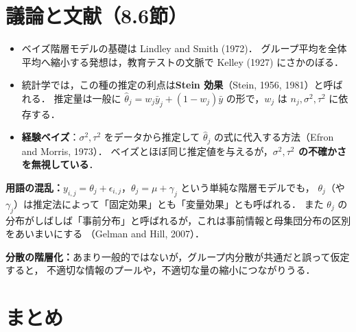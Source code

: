 \documentclass[lualatex,ja=standard,a4paper,12pt]{bxjsarticle}
\begin{document}
\section{議論と文献（8.6節）}

\begin{itemize}
  \item ベイズ階層モデルの基礎は Lindley and Smith (1972)．
        グループ平均を全体平均へ縮小する発想は，教育テストの文脈で Kelley (1927) にさかのぼる．
  \item 統計学では，この種の推定の利点は\textbf{Stein 効果}（Stein, 1956, 1981）と呼ばれる．
        推定量は一般に $\hat{\theta}_j = w_j\bar{y}_j + (1 - w_j)\bar{y}$ の形で，$w_j$ は $n_j, \sigma^2, \tau^2$ に依存する．
  \item \textbf{経験ベイズ}：$\sigma^2, \tau^2$ をデータから推定して $\hat{\theta}_j$ の式に代入する方法（Efron and Morris, 1973）．
        ベイズとほぼ同じ推定値を与えるが，\textbf{$\sigma^2, \tau^2$ の不確かさを無視している}．
\end{itemize}

\begin{warningbox}
\textbf{用語の混乱：}$y_{i,j} = \theta_j + \epsilon_{i,j}$，$\theta_j = \mu + \gamma_j$ という単純な階層モデルでも，
$\theta_j$（や $\gamma_j$）は推定法によって「固定効果」とも「変量効果」とも呼ばれる．
また $\theta_j$ の分布がしばしば「事前分布」と呼ばれるが，これは事前情報と母集団分布の区別をあいまいにする
（Gelman and Hill, 2007）．

\medskip
\textbf{分散の階層化：}あまり一般的ではないが，グループ内分散が共通だと誤って仮定すると，
不適切な情報のプールや，不適切な量の縮小につながりうる．
\end{warningbox}

\section{まとめ}
\end{document}
